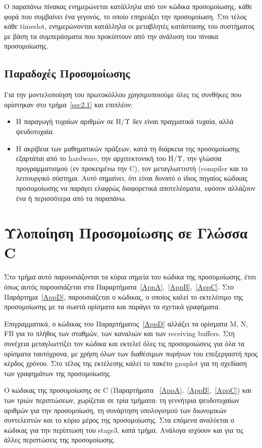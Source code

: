 \documentclass[12pt]{report}
\begin{document}
Ο παραπάνω πίνακας ενημερώνεται κατάλληλα από τον κώδικα προσομοίωσης, κάθε φορά που συμβαίνει ένα γεγονός, το οποίο επηρεάζει την προσομοίωση. Στο τέλος κάθε \textlatin{timeslot}, ενημερώνονται κατάλληλα οι μεταβλητές κατάστασης του συστήματος με βάση τα συμπεράσματα που προκύπτουν από την ανάλυση του πίνακα προσομοίωσης.

\subsection{Παραδοχές Προσομοίωσης}
Για την μοντελοποίηση του πρωτοκόλλου χρησιμοποιούμε όλες τις συνθήκες που ορίστηκαν στο τμήμα~\ref{sec2.1} και επιπλέον:
\begin{itemize}
	\item Η παραγωγή τυχαίων αριθμών σε Η/Υ δεν είναι πραγματικά τυχαία, αλλά ψευδοτυχαία.
	\item Η ακρίβεια των μαθηματικών πράξεων, κατά τη διάρκεια της προσομοίωσης εξαρτάται από το \textlatin{hardware}, την αρχιτεκτονική του Η/Υ, την γλώσσα προγραμματισμού (εν προκειμένω την \textlatin{C}), τον μεταγλωττιστή (\textlatin{compiler} και το λειτουργικό σύστημα. Αυτό σημαίνει, ότι είναι δυνατό ο ίδιος πηγαίος κώδικας προσομοίωσης να παράγει ελαφρώς διαφορετικά αποτελέσματα, εφόσον αλλάζουν ένα ή περισσότερα από τα παραπάνω.
\end{itemize}

\section{Υλοποίηση Προσομοίωσης σε Γλώσσα \textlatin{C}}
Στο τμήμα αυτό παρουσιάζονται τα κύρια σημεία του κώδικα της προσομοίωσης, έτσι όπως αυτός παρουσιάζεται στα Παραρτήματα~\ref{AppA},~\ref{AppB},~\ref{AppC}. Στο Παράρτημα~\ref{AppD}, παρουσιάζεται ο κώδικας, ο οποίος καλεί το εκτελέσιμο της προσομοίωσης με τα σωστά ορίσματα και παράγει τα σχετικά γραφήματα.

Επιγραμματικά, ο κώδικας του Παραρτήματος~\ref{AppD} αλλάζει τα ορίσματα \textlatin{M, N, FB} για το πλήθος των σταθμών, των καναλιών και των \textlatin{receiving buffers}. Στη συνέχεια μεταγλωττίζει τον κώδικα και εκτελεί όλες τις προσομοιώσεις για όλα τα ορίσματα ταυτόχρονα, με χρήση όλων των διαθέσιμων πυρήνων του επεξεργαστή προς κέρδος χρόνου. Στο τέλος της εκτέλεσης καλεί το πακέτο \textlatin{gnuplot} για τη σχεδίαση των γραφημάτων της προσομοίωσης.

Ο κώδικας της προσομοίωσης σε \textlatin{C} (Παραρτήματα ~\ref{AppA},~\ref{AppB},~\ref{AppC}) και των τριών περιπτώσεων, χωρίζεται σε τρία τμήματα: τη γεννήτρια ψευδοτυχαίων αριθμών για την προσομοίωση, τη συνάρτηση υπολογισμού των διωνυμικών συντελεστών και το κύριο μέρος της προσομοίωσης. Στα επόμενα αναλύεται ο κώδικας για την περίπτωση του \textlatin{stage3}, κατά τμήμα. Ανάλογα ισχύουν και για τις άλλες περιπτώσεις της προσομοίωσης.
\end{document}

